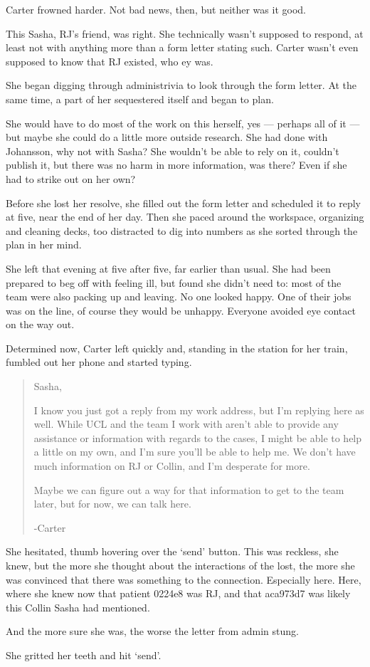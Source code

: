 Carter frowned harder. Not bad news, then, but neither was it good.

This Sasha, RJ's friend, was right. She technically wasn't supposed to respond, at least not with anything more than a form letter stating such. Carter wasn't even supposed to know that RJ existed, who ey was.

She began digging through administrivia to look through the form letter. At the same time, a part of her sequestered itself and began to plan.

She would have to do most of the work on this herself, yes — perhaps all of it — but maybe she could do a little more outside research. She had done with Johansson, why not with Sasha? She wouldn't be able to rely on it, couldn't publish it, but there was no harm in more information, was there? Even if she had to strike out on her own?

Before she lost her resolve, she filled out the form letter and scheduled it to reply at five, near the end of her day. Then she paced around the workspace, organizing and cleaning decks, too distracted to dig into numbers as she sorted through the plan in her mind.

She left that evening at five after five, far earlier than usual. She had been prepared to beg off with feeling ill, but found she didn't need to: most of the team were also packing up and leaving. No one looked happy. One of their jobs was on the line, of course they would be unhappy. Everyone avoided eye contact on the way out.

Determined now, Carter left quickly and, standing in the station for her train, fumbled out her phone and started typing.

\begin{quote}
Sasha,

I know you just got a reply from my work address, but I'm replying here as well. While UCL and the team I work with aren't able to provide any assistance or information with regards to the cases, I might be able to help a little on my own, and I'm sure you'll be able to help me. We don't have much information on RJ or Collin, and I'm desperate for more.

Maybe we can figure out a way for that information to get to the team later, but for now, we can talk here.

-Carter
\end{quote}

She hesitated, thumb hovering over the `send' button. This was reckless, she knew, but the more she thought about the interactions of the lost, the more she was convinced that there was something to the connection. Especially here. Here, where she knew now that patient 0224e8 was RJ, and that aca973d7 was likely this Collin Sasha had mentioned.

And the more sure she was, the worse the letter from admin stung.

She gritted her teeth and hit `send'.
